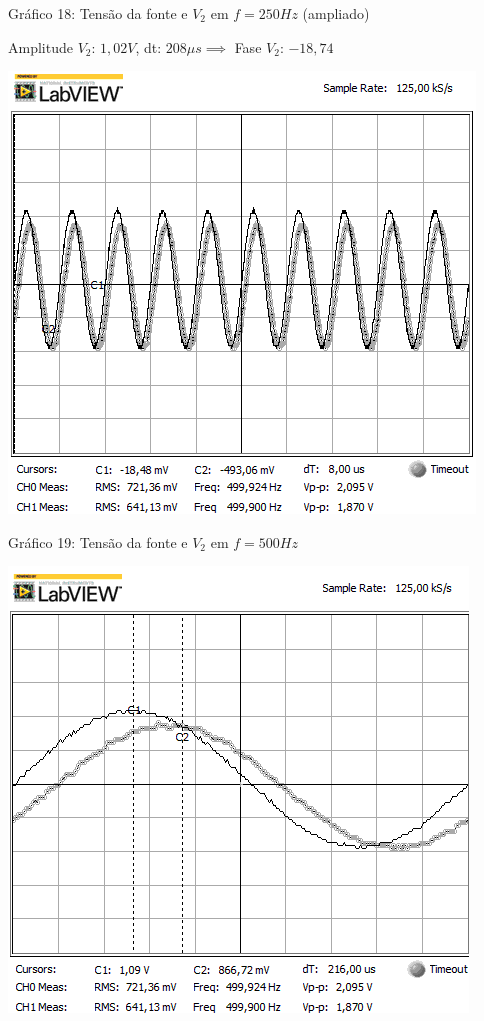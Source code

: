 \begin{center}
Gráfico 18: Tensão da fonte e $V_2$ em $f=250Hz$ (ampliado)
\end{center}

Amplitude $V_2$: $1,02V$, dt: $208\mu s\implies$ Fase $V_2$: $-18,74$\textdegree

\newpage
\begin{table}[h]
\centering
\includegraphics[scale=0.725]{rgadicoas/rgadicoa6}
\end{table}

\begin{center}
Gráfico 19: Tensão da fonte e $V_2$ em $f=500Hz$ 
\end{center}

\begin{table}[h]
\centering
\includegraphics[scale=0.725]{rgadicoas/rgadicoa6-2}
\end{table}

